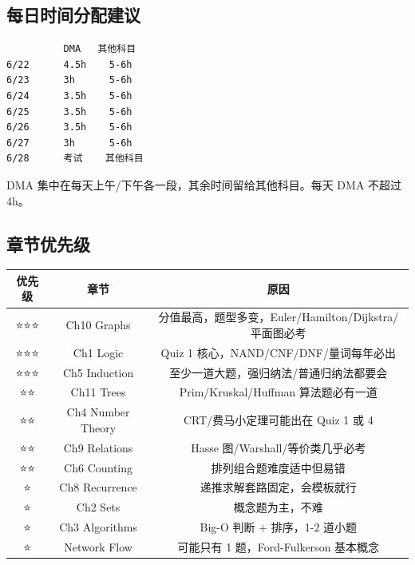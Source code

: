 \documentclass[10pt,a4paper,openany]{ctexbook}
\theoremstyle{definition}
\theoremstyle{remark}
\renewenvironment{quote}
  {\list{}{\leftmargin=1em\rightmargin=0pt\topsep=0.5pt\partopsep=0pt}\item[]}
  {\endlist}
\begin{document}
\vspace{-2pt}

\subsection{每日时间分配建议}

{\footnotesize\begin{verbatim}
          DMA   其他科目
6/22      4.5h    5-6h
6/23      3h      5-6h
6/24      3.5h    5-6h
6/25      3.5h    5-6h
6/26      3.5h    5-6h
6/27      3h      5-6h
6/28      考试    其他科目
\end{verbatim}}

\begin{quote}
DMA 集中在每天上午/下午各一段，其余时间留给其他科目。每天 DMA 不超过 4h。

\end{quote}
\vspace{-2pt}

\subsection{章节优先级}

\begin{center}
\begin{tabular}{ccc}
\hline
优先级 & 章节 & 原因 \\ \hline
⭐⭐⭐ & Ch10 Graphs & 分值最高，题型多变，Euler/Hamilton/Dijkstra/平面图必考 \\
⭐⭐⭐ & Ch1 Logic & Quiz 1 核心，NAND/CNF/DNF/量词每年必出 \\
⭐⭐⭐ & Ch5 Induction & 至少一道大题，强归纳法/普通归纳法都要会 \\
⭐⭐ & Ch11 Trees & Prim/Kruskal/Huffman 算法题必有一道 \\
⭐⭐ & Ch4 Number Theory & CRT/费马小定理可能出在 Quiz 1 或 4 \\
⭐⭐ & Ch9 Relations & Hasse 图/Warshall/等价类几乎必考 \\
⭐⭐ & Ch6 Counting & 排列组合题难度适中但易错 \\
⭐ & Ch8 Recurrence & 递推求解套路固定，会模板就行 \\
⭐ & Ch2 Sets & 概念题为主，不难 \\
⭐ & Ch3 Algorithms & Big-O 判断 + 排序，1-2 道小题 \\
⭐ & Network Flow & 可能只有 1 题，Ford-Fulkerson 基本概念 \\
\hline
\end{tabular}

\end{center}
\end{document}
